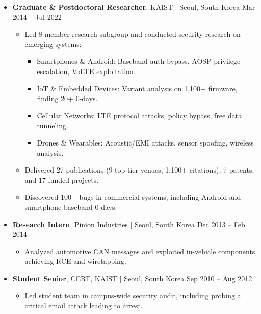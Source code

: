 \documentclass[11pt,letterpaper]{article}
\newcommand{\jobtitle}[1]{\textbf{#1}}
\newcommand{\location}[1]{\textcolor{secondary}{\small #1}}
\newcommand{\daterange}[1]{\textcolor{secondary}{\small #1}}
\begin{document}
\begin{itemize}
\item \jobtitle{Graduate \& Postdoctoral Researcher}, \location{KAIST | Seoul, South Korea} \hfill \daterange{Mar 2014 -- Jul 2022}
    \begin{itemize}[] %
    \item Led 8-member research subgroup and conducted security research on emerging systems:
        \begin{itemize}[]
        \item Smartphones \& Android: Baseband auth bypass, AOSP privilege escalation, VoLTE exploitation.
        \item IoT \& Embedded Devices: Variant analysis on 1,100+ firmware, finding 20+ 0-days.
        \item Cellular Networks: LTE protocol attacks, policy bypass, free data tunneling.
        \item Drones \& Wearables: Acoustic/EMI attacks, sensor spoofing, wireless analysis.
        \end{itemize}
    \item Delivered 27 publications (9 top-tier venues, 1,100+ citations), 7 patents, and 17 funded projects.
    \item Discovered 100+ bugs in commercial systems, including Android and smartphone baseband 0-days.
    \end{itemize}

\item \jobtitle{Research Intern}, \location{Pinion Industries | Seoul, South Korea} \hfill \daterange{Dec 2013 -- Feb 2014}
    \begin{itemize}[] %
    \item Analyzed automotive CAN messages and exploited in-vehicle components, achieving RCE and wiretapping.
    \end{itemize}

\item \jobtitle{Student Senior}, \location{CERT, KAIST | Seoul, South Korea} \hfill \daterange{Sep 2010 -- Aug 2012}
    \begin{itemize}[] %
    \item Led student team in campus-wide security audit, including probing a critical email attack leading to arrest.
    \end{itemize}
\end{itemize}

\end{document}
